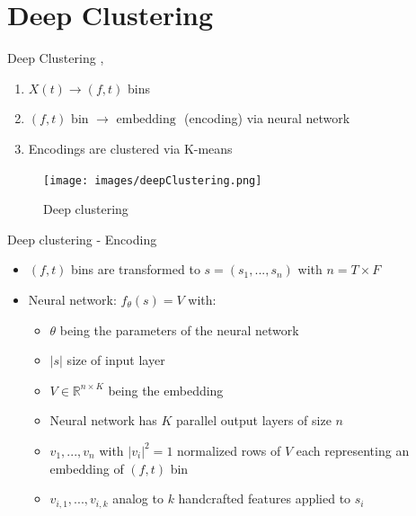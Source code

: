 \documentclass[xcolor=table,mathserif,9pt]{beamer}    %
\begin{document}
\section{Deep Clustering}%
\label{sec:deep_clustering}
\begin{frame}{Deep Clustering \cite{SingleChannelSourceSeparation}, \cite{BasicDeepClustering:2016}}

\begin{enumerate}
	\item $X(t) \to (f,t)$ bins
	\item $(f,t) \text{ bin } \to \text{ embedding }$ (encoding) via neural network
	\item Encodings are clustered via K-means
\end{enumerate}

\begin{figure}[htpb]
	\centering
	\texttt{[image: images/deepClustering.png]}
	\caption{Deep clustering}
\end{figure}

\end{frame}

\begin{frame}{Deep clustering - Encoding}

 \begin{itemize}
	 \item $(f,t)$ bins are transformed to 
		 $s = (s_1, ..., s_n)$  with $n = T \times F$
	 \item Neural network: \emph{$f_{\theta}(s) = V$} with: 
		\begin{itemize}
			\item $\theta$ being the parameters of the neural network
			\item $|s|$ size of input layer
			\item $V \in \mathbb{R}^{n \times K}$ being the embedding
			\item Neural network has $K$ parallel output layers of size $n$
		        \item $v_1, ..., v_n$ with \emph{$|v_i|^2 = 1$} normalized rows of $V$
			      each representing an embedding of $(f,t)$ bin 
			\item $v_{i,1}, ..., v_{i,k}$ analog to $k$ handcrafted 
			      features applied to $s_i$
		\end{itemize}
 \end{itemize}
\end{frame}
\end{document}
